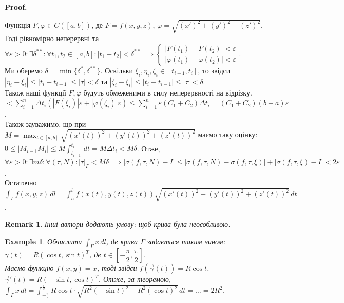 \documentclass[a4paper, 10pt]{article}
\makeatletter
\def\qed{$\blacksquare$}
\theoremstyle{theoremdd}
\theoremstyle{theoremdd}
\theoremstyle{theoremdd}
\theoremstyle{theoremdd}
\newtheorem{example}[theorem]{Example}
\theoremstyle{theoremdd}
\theoremstyle{theoremdd}
\newtheorem{remark}[theorem]{Remark}
\theoremstyle{theoremdd}
\theoremstyle{theoremdd}
\renewenvironment{proof}[1][Proof.\\]{\par
\pushQED{\hfill \qed}%
\normalfont \topsep6\p@\@plus6\p@\relax
\trivlist
\item\relax
{\bfseries
#1\@addpunct{.}}\hspace\labelsep\ignorespaces
}{%
\popQED\endtrivlist\@endpefalse
}
\makeatother
\begin{document}
\begin{proof}
Функція $F,\varphi \in C([a,b])$, де $F = f(x,y,z)$, $\varphi = \sqrt{(x')^2 + (y')^2 + (z')^2}$. Тоді рівномірно неперервні та\\
$\forall \varepsilon > 0: \exists \delta^{**}: \forall t_1,t_2 \in [a,b]: |t_1-t_2| < \delta^{**} \implies \begin{cases} |F(t_1)-F(t_2)| < \varepsilon \\ |\varphi(t_1) - \varphi(t_2)| < \varepsilon \end{cases}$.\\
Ми оберемо $\delta = \min \{ \delta^*, \delta^{**}\}$. Оскільки $\xi_i,\eta_i,\zeta_i \in [t_{i-1},t_i]$, то звідси $|\eta_i - \xi_i| \leq |t_i - t_{i-1}| \leq |\tau| < \delta$ та $|\zeta_i - \xi_i| \leq |t_i - t_{i-1}| \leq |\tau| < \delta$.\\
Також наші функції $F,\varphi$ будуть обмеженими в силу неперервності на відрізку.\\
$< \displaystyle\sum_{i=1}^n \Delta t_i ( |F(\xi_i)| \varepsilon + |\varphi(\zeta_i)| \varepsilon ) \leq \sum_{i=1}^n \varepsilon(C_1+C_2) \Delta t_i = (C_1+C_2)(b-a)\varepsilon$.\\
Також зауважимо, що при $M = \displaystyle\max_{t \in [a,b]} \sqrt{(x'(t))^2 + (y'(t))^2 + (z'(t))^2}$ маємо таку оцінку:\\
$0 \leq |M_{i-1}M_i| \leq M \displaystyle\int_{t_{i-1}}^{t_i}\,dt = M \Delta t_i < M \delta$. Отже, \\
$\forall \varepsilon > 0: \exists m \delta: \forall (\tau, N): |\tau|_\Gamma < M \delta \implies |\sigma(f,\tau,N) - I| \leq |\sigma(f,\tau,N) - \sigma(f,\tau,\xi)| + |\sigma(f,\tau,\xi) - I| < 2\varepsilon$.\\
Остаточно $\displaystyle\int_\Gamma f(x,y,z)\,dl = \int_a^b f(x(t),y(t),z(t)) \sqrt{(x'(t))^2 + (y'(t))^2 + (z'(t))^2}\,dt$.
\end{proof}

\begin{remark}
Інші автори додають умову: щоб крива була неособливою.
\end{remark}

\begin{example}
Обчислити $\displaystyle\int_\Gamma x\,dl$, де крива $\Gamma$ задається таким чином:\\
$\gamma(t) = R(\cos t, \sin t)^T$, де $t \in \left[ -\dfrac{\pi}{2}, \dfrac{\pi}{2} \right]$.\\
Маємо функцію $f(x,y) = x$, тоді звідси $f(\vec{\gamma}(t)) = R \cos t$.\\
$\vec{\gamma}'(t) = R (-\sin t, \cos t)^T$. Отже, за теоремою, \\ $\displaystyle\int_\Gamma x\,dl = \int_{-\frac{\pi}{2}}^{\frac{\pi}{2}} R \cos t \cdot \sqrt{R^2 (-\sin t)^2 + R^2 (\cos t)^2}\,dt = \dots = 2R^2$.
\end{example}
\end{document}

